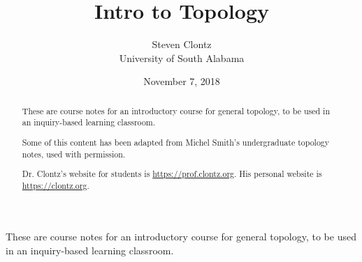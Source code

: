 \documentclass[10pt,]{article}
\title{Intro to Topology}
\author{Steven Clontz\\
University of South Alabama
}
\date{November 7, 2018}
\begin{document}
\hypertarget{index}{}
\maketitle
\thispagestyle{empty}
\begin{abstract}
\hypertarget{p-1}{}%
These are course notes for an introductory course for general topology, to be used in an inquiry-based learning classroom.%
\par
\hypertarget{p-2}{}%
Some of this content has been adapted from Michel Smith's undergraduate topology notes, used with permission.%
\par
\hypertarget{p-3}{}%
Dr. Clontz's website for students is \url{https://prof.clontz.org}. His personal website is \url{https://clontz.org}.%
\end{abstract}
\hypertarget{p-4}{}%
These are course notes for an introductory course for general topology, to be used in an inquiry-based learning classroom.%
%
%
\typeout{************************************************}
\typeout{************************************************}
%
\end{document}
